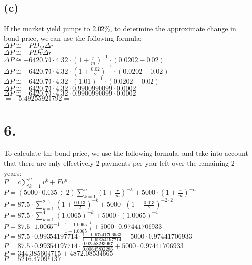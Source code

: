 \documentclass{article}
\begin{document}
{\subsection*{(c)}

If the market yield jumps to 2.02\%, to determine the approximate change in bond price, we can use the following formula: \\
$\Delta P \cong -P D_M \Delta r$ \\
$\Delta P \cong -P Dv \Delta r$ \\
$\Delta P \cong -6420.70 \cdot 4.32 \cdot (1 + \frac{r}{m})^{-1} \cdot (0.0202 - 0.02)$ \\
$\Delta P \cong -6420.70 \cdot 4.32 \cdot (1 + \frac{0.02}{2})^{-1} \cdot (0.0202 - 0.02)$ \\
$\Delta P \cong -6420.70 \cdot 4.32 \cdot (1.01)^{-1} \cdot (0.0202 - 0.02)$ \\
$\Delta P \cong -6420.70 \cdot 4.32 \cdot 0.9900990099 \cdot 0.0002$ \\
$\Delta P \cong -6420.70 \cdot 4.32 \cdot 0.9900990099 \cdot 0.0002$ \\
$= -5.49255920792 = $

}

\section*{6.}
{\Large 
To calculate the bond price, we use the following formula, and take into account that there are only effectively 2 payments per year left over the remaining 2 years: \\ 
$P = c \sum_{k=1}^{n} v^k + Fv^n$ \\
$P = (5000 \cdot 0.035 \div 2) \sum_{k=1}^{n} (1 + \frac{r}{m})^{-k} + 5000 \cdot (1 + \frac{r}{m})^{-n}$ \\
$P = 87.5 \cdot \sum_{k=1}^{2 \cdot 2} (1 + \frac{0.013}{2})^{-k} + 5000 \cdot (1 + \frac{0.013}{2})^{-2 \cdot 2}$ \\
$P = 87.5 \cdot \sum_{k=1}^{4} (1.0065)^{-k} + 5000 \cdot (1.0065)^{-4}$ \\
$P = 87.5 \cdot 1.0065^{-1} \cdot \frac{1 - 1.0065^{-4}}{1 - 1.0065^{-1}} + 5000 \cdot 0.97441706933$ \\
$P = 87.5 \cdot 0.99354197714 \cdot \frac{1 - 0.97441706933}{1 - 0.99354197714} + 5000 \cdot 0.97441706933$ \\
$P = 87.5 \cdot 0.99354197714 \cdot \frac{0.02558293067}{0.00645802286} + 5000 \cdot 0.97441706933$ \\
$P = 344.385604715 + 4872.08534665$ \\ 
$P = 5216.47095137 = $ 

}
\end{document}
